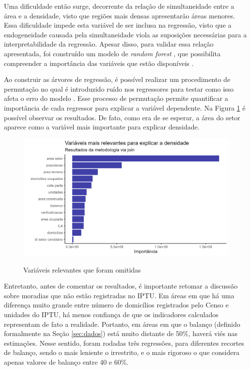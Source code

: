 Uma dificuldade então surge, decorrente da relação de simultaneidade entre a área e a densidade, visto que regiões mais densas apresentarão áreas menores. Essa dificuldade impede esta variável de ser inclusa na regressão, visto que a endogeneidade causada pela simultaneidade viola as suposições necessárias para a interpretabilidade da regressão. Apesar disso, para validar essa relação apresentada, foi construído um modelo de \textit{random forest} , que possibilita compreender a importância das variáveis que estão disponíveis \cite{wright2015ranger}.

Ao construir as árvores de regressão, é possível realizar um procedimento de permutação no qual é introduzido ruído nos regressores para testar como isso afeta o erro do modelo \cite{breiman2001random, Nembrini2018}. Esse processo de permutação permite quantificar a importância de cada regressor para explicar a variável dependente. Na Figura \ref{fig:importancia} é possível observar os resultados. De fato, como era de se esperar, a área do setor aparece como a variável mais importante para explicar densidade.

\begin{figure}[h]
    \centering
    \caption{Variáveis relevantes que foram omitidas}
    \includegraphics[width = .8\linewidth]{imagens/importancia.png}
    \label{fig:importancia}
\end{figure}

Entretanto, antes de comentar os resultados, é importante retomar a discussão sobre moradias que não estão registradas no IPTU. Em áreas em que há uma diferença muito grande entre número de domicílios registrados pelo Censo e unidades do IPTU, há menos confiança de que os indicadores calculados representam de fato a realidade. Portanto, em áreas em que o balanço (definido formalmente na Seção \ref{sec:dados}) está muito distante de 50\%, haverá viés nas estimações. Nesse sentido, foram rodadas três regressões, para diferentes recortes de balanço, sendo o mais leniente o irrestrito, e o mais rigoroso o que considera apenas valores de balanço entre 40 e 60\%.

